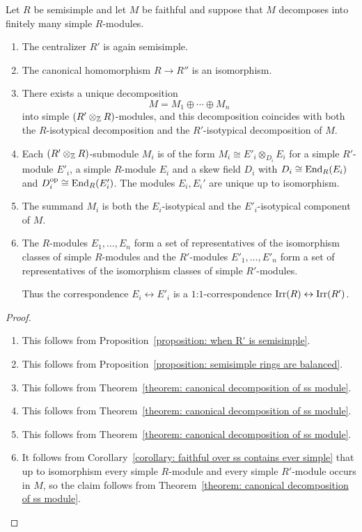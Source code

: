 \begin{theorem}
  \label{theorem: general double centralizer theorem}
  Let $R$ be semisimple and let $M$ be faithful and suppose that $M$ decomposes into finitely many simple $R$-modules.
  \begin{enumerate}
    \item
      The centralizer $R'$ is again semisimple.
    \item
      The canonical homomorphism $R \to R''$ is an isomorphism.
    \item
      There exists a unique decomposition
      \[
          M
        = M_1 \oplus \dotsb \oplus M_n
      \]
      into simple $(R' \otimes_{\mathbb{Z}} R)$-modules, and this decomposition coincides with both the $R$-isotypical decomposition and the $R'$-isotypical decomposition of $M$.
    \item
      Each $(R' \otimes_{\mathbb{Z}} R)$-submodule $M_i$ is of the form $M_i \cong E'_i \otimes_{D_i} E_i$ for a simple $R'$-module $E'_i$, a simple $R$-module $E_i$ and a skew field $D_i$ with $D_i \cong \operatorname{End}_R(E_i)$ and $D_i^{\operatorname{op}} \cong \operatorname{End}_R(E'_i)$.
      The modules $E_i, E_i'$ are unique up to isomorphism.
    \item
      The summand $M_i$ is both the $E_i$-isotypical and the $E'_i$-isotypical component of $M$.
    \item
      The $R$-modules $E_1, \dotsc, E_n$ form a set of representatives of the isomorphism classes of simple $R$-modules and the $R'$-modules $E'_1, \dotsc, E'_n$ form a set of representatives of the isomorphism classes of simple $R'$-modules.
      
      Thus the correspondence $E_i \leftrightarrow E'_i$ is a $1$:$1$-correspondence $\operatorname{Irr}(R) \leftrightarrow \operatorname{Irr}(R')$.
  \end{enumerate}
\end{theorem}


\begin{proof}
  \leavevmode
  \begin{enumerate}
    \item
      This follows from Proposition~\ref{proposition: when R' is semisimple}.
    \item
      This follows from Proposition~\ref{proposition: semisimple rings are balanced}.
    \item
      This follows from Theorem~\ref{theorem: canonical decomposition of ss module}.
    \item
      This follows from Theorem~\ref{theorem: canonical decomposition of ss module}.
    \item
      This follows from Theorem~\ref{theorem: canonical decomposition of ss module}.
    \item
      It follows from Corollary~\ref{corollary: faithful over ss contains ever simple} that up to isomorphism every simple $R$-module and every simple $R'$-module occurs in $M$, so the claim follows from Theorem~\ref{theorem: canonical decomposition of ss module}.
    \qedhere
  \end{enumerate}
\end{proof}


